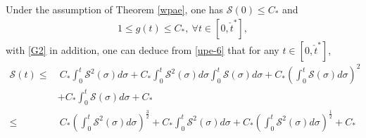 \documentclass{amsart}
\numberwithin{equation}{section}
\begin{document}
Under the assumption of Theorem \ref{wpae}, one has $\mathcal{S}(0)\leq C_{*}$ and
\begin{align*}
1\leq g(t)\leq C_{*},~\forall t\in [0,\check{t}^{*}],
\end{align*}
with \eqref{G2} in addition, one can deduce from \eqref{upe-6} that for any $t\in[0,\check{t}^{*}]$,
\begin{align}\label{upe-6'}
\mathcal{S}(t)
\leq&~C_{*}\int_{0}^{t}\mathcal{S}^{2}(\sigma)d\sigma
     +C_{*}\int_{0}^{t}\mathcal{S}^{2}(\sigma)d\sigma\int_{0}^{t}\mathcal{S}(\sigma)d\sigma
     +C_{*}\left(\int_{0}^{t}\mathcal{S}(\sigma)d\sigma\right)^{2}\\
    &+C_{*}\int_{0}^{t}\mathcal{S}(\sigma)d\sigma
     +C_{*}\nonumber\\
\leq&~C_{*}\left(\int_{0}^{t}\mathcal{S}^{2}(\sigma)d\sigma\right)^{\frac{3}{2}}
     +C_{*}\int_{0}^{t}\mathcal{S}^{2}(\sigma)d\sigma
     +C_{*}\left(\int_{0}^{t}\mathcal{S}^{2}(\sigma)d\sigma\right)^{\frac{1}{2}}
     +C_{*}\nonumber
\end{align}
\end{document}
